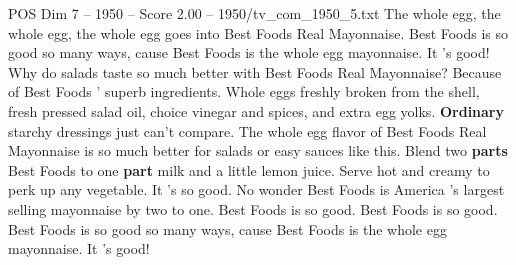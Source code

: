 \begin{textsample}{POS Dim 7 – 1950 – Score 2.00 – 1950/tv\_com\_1950\_5.txt}  \label{ex:f7_pos_018}
The whole egg, the whole egg, the whole egg goes into Best Foods Real Mayonnaise.
Best Foods is so good so many ways, cause Best Foods is the whole egg mayonnaise.
It 's good!
Why do salads taste so much better with Best Foods Real Mayonnaise?
Because of Best Foods ' superb ingredients.
Whole eggs freshly broken from the shell, fresh pressed salad oil, choice vinegar and spices, and extra egg yolks. \textbf{Ordinary} starchy dressings just can't compare.
The whole egg flavor of Best Foods Real Mayonnaise is so much better for salads or easy sauces like this.
Blend two \textbf{parts} Best Foods to one \textbf{part} milk and a little lemon juice.
Serve hot and creamy to perk up any vegetable.
It 's so good.
No wonder Best Foods is America 's largest selling mayonnaise by two to one.
Best Foods is so good.
Best Foods is so good.
Best Foods is so good so many ways, cause Best Foods is the whole egg mayonnaise.
It 's good!

\end{textsample}
